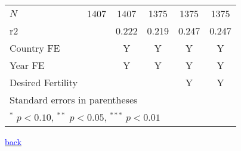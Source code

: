 \documentclass[10pt,letterpaper,subeqn]{beamer}
\begin{document}
\begin{frame}[label=placebo2]
\begin{table}[htbp]
\begin{tabular}{l*{5}{c}}
\hline
\(N\)       &        1407         &        1407         &        1375         &        1375         &        1375         \\
r2          &                     &       0.222         &       0.219         &       0.247         &       0.247         \\
\hline
Country FE        &                     &    Y                 &      Y               &     Y         &               Y         \\
Year FE            &                     &    Y                 &      Y               &     Y         &             Y         \\
Desired Fertility &                     &                     &                     &       Y&             Y\\
\hline\hline
\multicolumn{6}{l}{\footnotesize Standard errors in parentheses}\\
\multicolumn{6}{l}{\footnotesize $^{*}$ \(p<0.10\), $^{**}$ \(p<0.05\), $^{***}$ \(p<0.01\)}\\
\end{tabular}
\end{table}
{\footnotesize \hyperlink{placebos}{\textcolor{blue}{back}}}
\end{frame}
\end{document}
